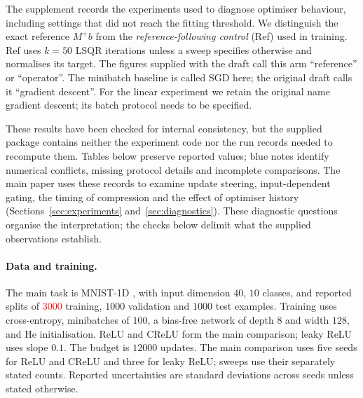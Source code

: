 \documentclass{article}
\newcommand{\nat}[1]{\textcolor{red}{#1}}
\theoremstyle{definition}
\theoremstyle{remark}
\begin{document}
The supplement records the experiments used to diagnose optimiser behaviour, including settings that did not reach the fitting threshold. We distinguish the exact reference $M^+b$ from the \emph{reference-following control} (Ref) used in training. Ref uses $k=50$ LSQR iterations unless a sweep specifies otherwise and normalises its target. The figures supplied with the draft call this arm ``reference'' or ``operator''. The minibatch baseline is called SGD here; the original draft calls it ``gradient descent''. For the linear experiment we retain the original name gradient descent; its batch protocol needs to be specified.

These results have been checked for internal consistency, but the supplied package contains neither the experiment code nor the run records needed to recompute them. Tables below preserve reported values; blue notes identify numerical conflicts, missing protocol details and incomplete comparisons. The main paper uses these records to examine update steering, input-dependent gating, the timing of compression and the effect of optimiser history (Sections~\ref{sec:experiments} and~\ref{sec:diagnostics}). These diagnostic questions organise the interpretation; the checks below delimit what the supplied observations establish.

\paragraph{Data and training.}
The main task is MNIST-1D \citep{greydanus2020mnist1d}, with input dimension $40$, $10$ classes, and reported splits of \nat{$3000$} training, $1000$ validation and $1000$ test examples. Training uses cross-entropy, minibatches of $100$, a bias-free network of depth $8$ and width $128$, and He initialisation. ReLU and CReLU form the main comparison; leaky ReLU uses slope $0.1$. The budget is $12000$ updates. The main comparison uses five seeds for ReLU and CReLU and three for leaky ReLU; sweeps use their separately stated counts. Reported uncertainties are standard deviations across seeds unless stated otherwise.
\end{document}
